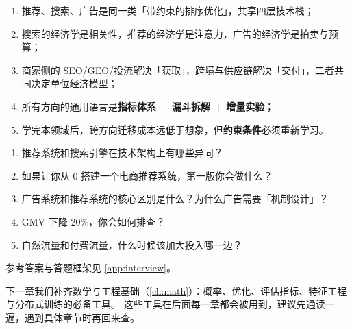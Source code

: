 \begin{keypoint}[本章要点回顾]
\begin{enumerate}
  \item 推荐、搜索、广告是同一类「带约束的排序优化」，共享四层技术栈；
  \item 搜索的经济学是相关性，推荐的经济学是注意力，广告的经济学是拍卖与预算；
  \item 商家侧的 SEO/GEO/投流解决「获取」，跨境与供应链解决「交付」，二者共同决定单位经济模型；
  \item 所有方向的通用语言是\textbf{指标体系 + 漏斗拆解 + 增量实验}；
  \item 学完本领域后，跨方向迁移成本远低于想象，但\textbf{约束条件}必须重新学习。
\end{enumerate}
\end{keypoint}

\begin{interview}[本章对应的面试题]
\begin{enumerate}
  \item 推荐系统和搜索引擎在技术架构上有哪些异同？
  \item 如果让你从 0 搭建一个电商推荐系统，第一版你会做什么？
  \item 广告系统和推荐系统的核心区别是什么？为什么广告需要「机制设计」？
  \item GMV 下降 20\%，你会如何排查？
  \item 自然流量和付费流量，什么时候该加大投入哪一边？
\end{enumerate}
参考答案与答题框架见 \cref{app:interview}。
\end{interview}

下一章我们补齐数学与工程基础（\cref{ch:math}）：概率、优化、评估指标、特征工程与分布式训练的必备工具。
这些工具在后面每一章都会被用到，建议先通读一遍，遇到具体章节时再回来查。
